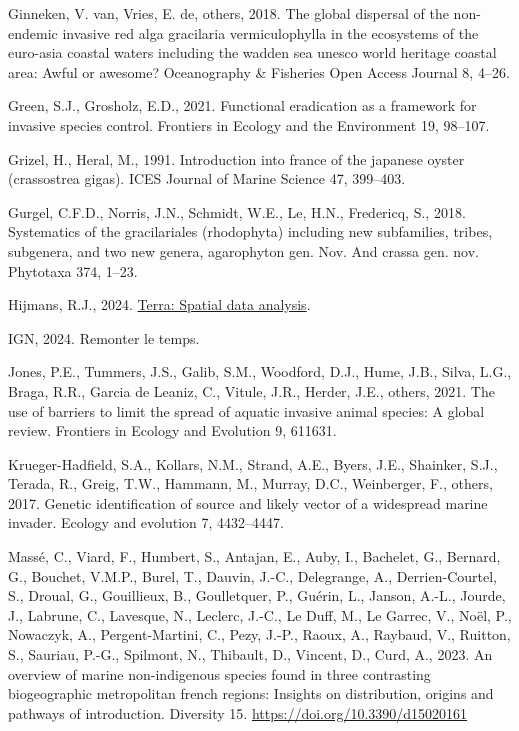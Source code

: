 \documentclass[
  letterpaper,
  DIV=11,
  numbers=noendperiod]{scrartcl}
\newlength{\cslhangindent}
\newenvironment{CSLReferences}[2] %
 {\begin{list}{}{%
  \setlength{\itemindent}{0pt}
  \setlength{\leftmargin}{0pt}
  \setlength{\parsep}{0pt}
  \ifodd #1
   \setlength{\leftmargin}{\cslhangindent}
   \setlength{\itemindent}{-1\cslhangindent}
  \fi
  \setlength{\itemsep}{#2\baselineskip}}}
 {\end{list}}
\begin{document}
\begin{CSLReferences}{1}{0}
Ginneken, V. van, Vries, E. de, others, 2018. The global dispersal of
the non-endemic invasive red alga gracilaria vermiculophylla in the
ecosystems of the euro-asia coastal waters including the wadden sea
unesco world heritage coastal area: Awful or awesome? Oceanography \&
Fisheries Open Access Journal 8, 4--26.

Green, S.J., Grosholz, E.D., 2021. Functional eradication as a framework
for invasive species control. Frontiers in Ecology and the Environment
19, 98--107.

Grizel, H., Heral, M., 1991. Introduction into france of the japanese
oyster (crassostrea gigas). ICES Journal of Marine Science 47, 399--403.

Gurgel, C.F.D., Norris, J.N., Schmidt, W.E., Le, H.N., Fredericq, S.,
2018. Systematics of the gracilariales (rhodophyta) including new
subfamilies, tribes, subgenera, and two new genera, agarophyton gen.
Nov. And crassa gen. nov. Phytotaxa 374, 1--23.

Hijmans, R.J., 2024.
\href{https://CRAN.R-project.org/package=terra}{Terra: Spatial data
analysis}.

IGN, 2024. Remonter le temps.

Jones, P.E., Tummers, J.S., Galib, S.M., Woodford, D.J., Hume, J.B.,
Silva, L.G., Braga, R.R., Garcia de Leaniz, C., Vitule, J.R., Herder,
J.E., others, 2021. The use of barriers to limit the spread of aquatic
invasive animal species: A global review. Frontiers in Ecology and
Evolution 9, 611631.

Krueger-Hadfield, S.A., Kollars, N.M., Strand, A.E., Byers, J.E.,
Shainker, S.J., Terada, R., Greig, T.W., Hammann, M., Murray, D.C.,
Weinberger, F., others, 2017. Genetic identification of source and
likely vector of a widespread marine invader. Ecology and evolution 7,
4432--4447.

Massé, C., Viard, F., Humbert, S., Antajan, E., Auby, I., Bachelet, G.,
Bernard, G., Bouchet, V.M.P., Burel, T., Dauvin, J.-C., Delegrange, A.,
Derrien-Courtel, S., Droual, G., Gouillieux, B., Goulletquer, P.,
Guérin, L., Janson, A.-L., Jourde, J., Labrune, C., Lavesque, N.,
Leclerc, J.-C., Le Duff, M., Le Garrec, V., Noël, P., Nowaczyk, A.,
Pergent-Martini, C., Pezy, J.-P., Raoux, A., Raybaud, V., Ruitton, S.,
Sauriau, P.-G., Spilmont, N., Thibault, D., Vincent, D., Curd, A., 2023.
An overview of marine non-indigenous species found in three contrasting
biogeographic metropolitan french regions: Insights on distribution,
origins and pathways of introduction. Diversity 15.
\url{https://doi.org/10.3390/d15020161}


\end{CSLReferences}
\end{document}
